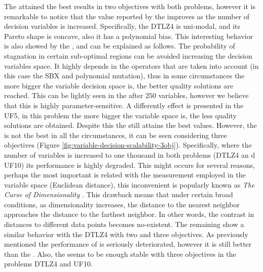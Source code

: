 %
%
%
%
%
The \VSDMOEA{} attained the best results in two objectives with both problems, however it is remarkable to notice that the \HV{} value reported by the \NSGAII{} improves as the number of decision variables is increased.
%
Specifically, the DTLZ4 is uni-modal, and its Pareto shape is concave, also it has a polynomial bias.
%
This interesting behavior is also showed by the \RMOEA{}, and can be explained as follows.
%
The probability of stagnation in certain sub-optimal regions can be avoided increasing the decision variables space.
%
It highly depends in the operators that are taken into account (in this case the SBX and polynomial mutation), thus in some circumstances the more bigger the variable decision space is, the better quality solutions are reached.
%
This can be lightly seen in the \MOEAD{} after $250$ variables, however we believe that this \MOEA{} is highly parameter-sensitive.
%
A differently effect is presented in the UF5, in this problem the more bigger the variable space is, the less quality solutions are obtained.
%
Despite this the \VSDMOEA{} still attains the best \HV{} values.
%
However, the \VSDMOEA{} is not the best \MOEA{} in all the circumstances, it can be seen considering three objectives (Figure \ref{fig:variable-decision-scalability-3obj}).
%
Specifically, where the number of variables is increased to one thousand in both problems (DTLZ4 an d UF10) its performance is highly degraded.
%
This might occurs for several reasons, perhaps the most important is related with the measurement employed in the variable space (Euclidean distance), this inconvenient is popularly known as \textit{The Curse of Dimensionality} \cite{trunk1979problem, beyer1999nearest}.
%
This drawback means that under certain broad conditions, as dimensionality increases, the distance to the nearest neighbor approaches the distance to the farthest neighbor.
%
In other words, the contrast in distances to different data points becomes no-existent.
%
The remaining \MOEAS{} show a similar behavior with the DTLZ4 with two and three objectives.
%
As previously mentioned the performance of \VSDMOEA{} is seriously deteriorated, however it is still better than the \NSGAII{}.
%
Also, the \RMOEA{} seems to be enough stable with three objectives in the problems DTLZ4 and UF10.

